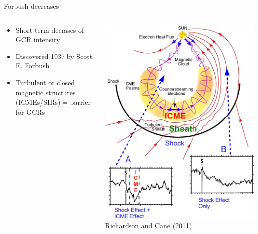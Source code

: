 \documentclass[10pt,aspectratio=169,usenames,dvipsnames]{beamer}
\begin{document}
\begin{frame}{Forbush decreases}
    \begin{columns}
        \begin{column}{0.55\textwidth}
            \begin{itemize}
                \item Short-term decrases of GCR intensity
                \item Discovered 1937 by Scott E. Forbush
                \item Turbulent or closed magnetic structures (ICMEs/SIRs) = barrier for GCRs
            \end{itemize}
        \end{column}
        \begin{column}{0.35\textwidth}
            \centering
            \includegraphics[width=\textwidth]{../images/richardson_cane_2011_icme_enhanced.png}
            \footnotesize Richardson and Cane (2011)
        \end{column}
    \end{columns}
\end{frame}
\end{document}
